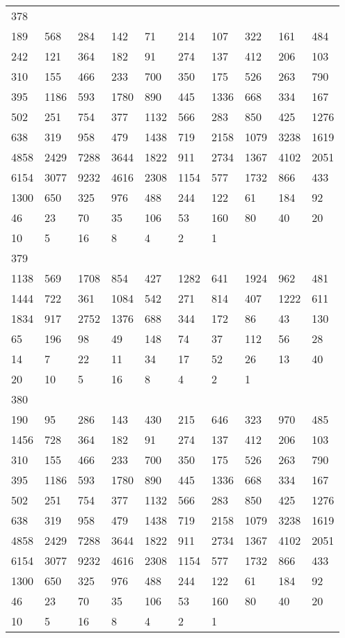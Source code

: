 \begin{longtable}{*{10}{l}}
378&&&&&&&&&\\
189& 568& 284& 142& 71& 214& 107& 322& 161& 484\\
242& 121& 364& 182& 91& 274& 137& 412& 206& 103\\
310& 155& 466& 233& 700& 350& 175& 526& 263& 790\\
395& 1186& 593& 1780& 890& 445& 1336& 668& 334& 167\\
502& 251& 754& 377& 1132& 566& 283& 850& 425& 1276\\
638& 319& 958& 479& 1438& 719& 2158& 1079& 3238& 1619\\
4858& 2429& 7288& 3644& 1822& 911& 2734& 1367& 4102& 2051\\
6154& 3077& 9232& 4616& 2308& 1154& 577& 1732& 866& 433\\
1300& 650& 325& 976& 488& 244& 122& 61& 184& 92\\
46& 23& 70& 35& 106& 53& 160& 80& 40& 20\\
10& 5& 16& 8& 4& 2& 1& \\

379&&&&&&&&&\\
1138& 569& 1708& 854& 427& 1282& 641& 1924& 962& 481\\
1444& 722& 361& 1084& 542& 271& 814& 407& 1222& 611\\
1834& 917& 2752& 1376& 688& 344& 172& 86& 43& 130\\
65& 196& 98& 49& 148& 74& 37& 112& 56& 28\\
14& 7& 22& 11& 34& 17& 52& 26& 13& 40\\
20& 10& 5& 16& 8& 4& 2& 1& \\

380&&&&&&&&&\\
190& 95& 286& 143& 430& 215& 646& 323& 970& 485\\
1456& 728& 364& 182& 91& 274& 137& 412& 206& 103\\
310& 155& 466& 233& 700& 350& 175& 526& 263& 790\\
395& 1186& 593& 1780& 890& 445& 1336& 668& 334& 167\\
502& 251& 754& 377& 1132& 566& 283& 850& 425& 1276\\
638& 319& 958& 479& 1438& 719& 2158& 1079& 3238& 1619\\
4858& 2429& 7288& 3644& 1822& 911& 2734& 1367& 4102& 2051\\
6154& 3077& 9232& 4616& 2308& 1154& 577& 1732& 866& 433\\
1300& 650& 325& 976& 488& 244& 122& 61& 184& 92\\
46& 23& 70& 35& 106& 53& 160& 80& 40& 20\\
10& 5& 16& 8& 4& 2& 1& \\


\end{longtable}
